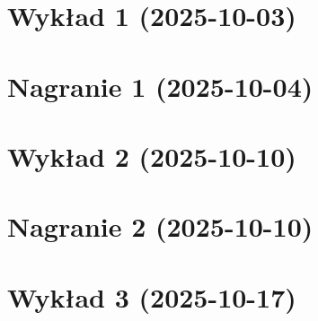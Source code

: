 \documentclass[12pt, a4paper, polish, openany]{book}
\begin{document}
\frontmatter



\tableofcontents


\titleformat{\chapter}[display]{\normalfont\Huge\bfseries}{}{0pt}{\Huge}
\titlespacing*{\chapter}{0pt}{0pt}{20pt}

\mainmatter

\chapter{Wykład 1 (2025-10-03)}


\chapter{Nagranie 1 (2025-10-04)}


\chapter{Wykład 2 (2025-10-10)}


\chapter{Nagranie 2 (2025-10-10)}


\chapter{Wykład 3 (2025-10-17)}

\end{document}
